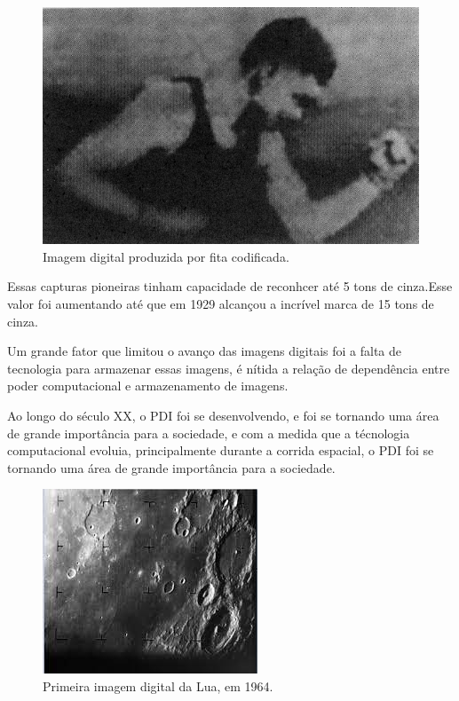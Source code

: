 \documentclass[12pt]{article}
\begin{document}
\begin{figure}[h]
  \centering
  \includegraphics{images/3 2}
  \caption{Imagem digital produzida por fita codificada.}
  \label{fig:exemplo}
\end{figure}

Essas capturas pioneiras tinham capacidade de reconhcer até 5 tons de cinza.Esse valor foi aumentando
até que em 1929 alcançou a incrível marca de 15 tons de cinza.

Um grande fator que limitou o avanço das imagens digitais foi a falta de tecnologia para armazenar
essas imagens, é nítida a relação de dependência entre poder computacional e armazenamento de imagens.

Ao longo do século XX, o PDI foi se desenvolvendo, e foi se tornando uma área de grande importância
para a sociedade, e com a medida que a técnologia computacional evoluia, principalmente durante a
corrida espacial, o PDI foi se tornando uma área de grande importância para a sociedade.


\begin{figure}[h]
  \centering
  \includegraphics{images/2}
  \caption{Primeira imagem digital da Lua, em 1964.}
  \label{fig:exemplo}
\end{figure}
\end{document}
